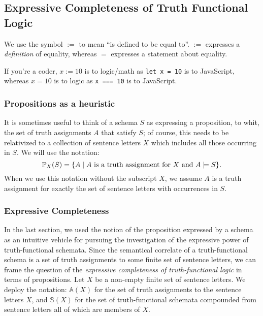 \subsection{Expressive Completeness of Truth Functional Logic}
\begin{definition}
    We use the symbol $:=$ to mean ``is defined to be equal to''. $:=$ expresses a \emph{definition} of equality, whereas $=$ expresses a statement about equality.

    If you're a coder, $x := 10$ is to logic/math as \verb|let x = 10| is to JavaScript, whereas $x = 10$ is to logic as \verb|x === 10| is to JavaScript.
\end{definition}

\subsubsection*{Propositions as a heuristic}
It is sometimes useful to think of a schema $S$ as expressing a proposition, to whit, the set of truth assignments $A$ that satisfy $S$; of course, this needs to be relativized to a collection of sentence letters $X$ which includes all those occurring in $S$. We will use the notation: 
\[\prop{S}{X} = \{ A\mid A\  \mbox{is a truth assignment for $X$ and } A\models S\}.
\]
 When we use this notation without the subscript $X$, we assume $A$ is a truth assignment for exactly the set of sentence letters with occurrences in $S$. 

\subsubsection*{Expressive Completeness}
In the last section, we used the notion of the proposition expressed by a schema as an intuitive vehicle for pursuing the investigation of the expressive power of truth-functional schemata. Since the semantical correlate of a truth-functional schema is a set of truth assignments to some finite set of sentence letters, we can frame the question of the \emph{expressive completeness of truth-functional logic} in terms of propositions. Let $X$ be a non-empty finite set of sentence letters. We deploy the notation: $\mathbb{A}(X)$ for the set of truth assignments to the sentence letters $X$, and $\mathbb{S}(X)$ for the set of truth-functional schemata compounded from sentence letters all of which are members of $X$. 

